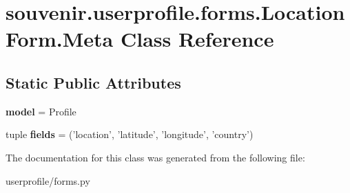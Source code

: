 \hypertarget{classsouvenir_1_1userprofile_1_1forms_1_1LocationForm_1_1Meta}{\section{souvenir.\-userprofile.\-forms.\-Location\-Form.\-Meta Class Reference}
\label{classsouvenir_1_1userprofile_1_1forms_1_1LocationForm_1_1Meta}
}
\subsection*{Static Public Attributes}
\begin{DoxyCompactItemize}
\item 
\hypertarget{classsouvenir_1_1userprofile_1_1forms_1_1LocationForm_1_1Meta_afc10682e60f7a9f3ea9abdee87408f4c}{{\bfseries model} = Profile}\label{classsouvenir_1_1userprofile_1_1forms_1_1LocationForm_1_1Meta_afc10682e60f7a9f3ea9abdee87408f4c}

\item 
\hypertarget{classsouvenir_1_1userprofile_1_1forms_1_1LocationForm_1_1Meta_ac751cbef32a6bb653298ee7461648c3b}{tuple {\bfseries fields} = ('location', 'latitude', 'longitude', 'country')}\label{classsouvenir_1_1userprofile_1_1forms_1_1LocationForm_1_1Meta_ac751cbef32a6bb653298ee7461648c3b}

\end{DoxyCompactItemize}


The documentation for this class was generated from the following file\-:\begin{DoxyCompactItemize}
\item 
userprofile/forms.\-py\end{DoxyCompactItemize}
